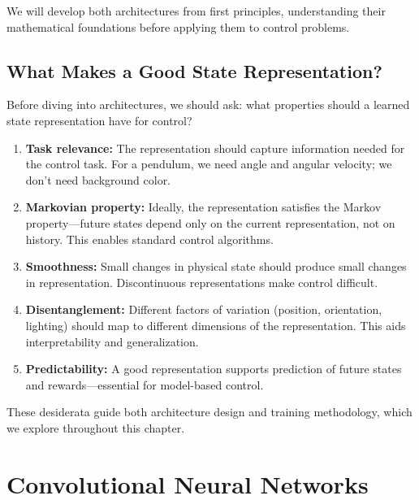 We will develop both architectures from first principles, understanding their mathematical foundations before applying them to control problems.

\subsection{What Makes a Good State Representation?}

Before diving into architectures, we should ask: what properties should a learned state representation have for control?

\begin{enumerate}
    \item \textbf{Task relevance:} The representation should capture information needed for the control task. For a pendulum, we need angle and angular velocity; we don't need background color.

    \item \textbf{Markovian property:} Ideally, the representation satisfies the Markov property---future states depend only on the current representation, not on history. This enables standard control algorithms.

    \item \textbf{Smoothness:} Small changes in physical state should produce small changes in representation. Discontinuous representations make control difficult.

    \item \textbf{Disentanglement:} Different factors of variation (position, orientation, lighting) should map to different dimensions of the representation. This aids interpretability and generalization.

    \item \textbf{Predictability:} A good representation supports prediction of future states and rewards---essential for model-based control.
\end{enumerate}

These desiderata guide both architecture design and training methodology, which we explore throughout this chapter.

\section{Convolutional Neural Networks}
\label{sec:cnn_fundamentals}

